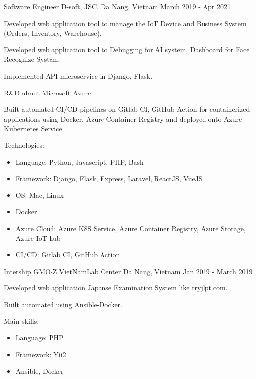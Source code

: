 \begin{cventries}
    \cventry
    {Software Engineer} %
    {D-soft, JSC.} %
    {Da Nang, Vietnam} %
    {March 2019 - Apr 2021} %
    {
      \begin{cvitems} %
        \item {Developed web application tool to manage the IoT Device and Business System (Orders, Inventory, Warehouse).}
        \item {Developed web application tool to Debugging for AI system, Dashboard for Face Recognize System.}
        \item {Implemented API microservice in Django, Flask.}
        \item {R\&D about Microsoft Azure.}
        \item {Built automated CI/CD pipelines on Gitlab CI, GitHub Action for containerized applications using Docker, Azure Container Registry and deployed onto Azure Kubernetes Service.}
        \item {Technologies:
            \begin{itemize}
                \item {Language: Python, Javascript, PHP, Bash}
                \item {Framework: Django, Flask, Express, Laravel, ReactJS, VueJS}
                \item {OS: Mac, Linux}
                \item {Docker}
                \item {Azure Cloud: Azure K8S Service, Azure Container Registry, Azure Storage, Azure IoT hub}
                \item {CI/CD: Gitlab CI, GitHub Action}
            \end{itemize}
        }
      \end{cvitems}
    }

    \cventry
    {Intership} %
    {GMO-Z VietNamLab Center} %
    {Da Nang, Vietnam} %
    {Jan 2019 - March 2019} %
    {
      \begin{cvitems} %
        \item {Developed web application Japanse Examination System like tryjlpt.com.}
        \item {Built automated using Ansible-Docker.}
        \item {Main skills:
            \begin{itemize}
                \item {Language: PHP}
                \item {Framework: Yii2}
                \item {Ansible, Docker}
            \end{itemize}
        }
      \end{cvitems}
    }

\end{cventries}
